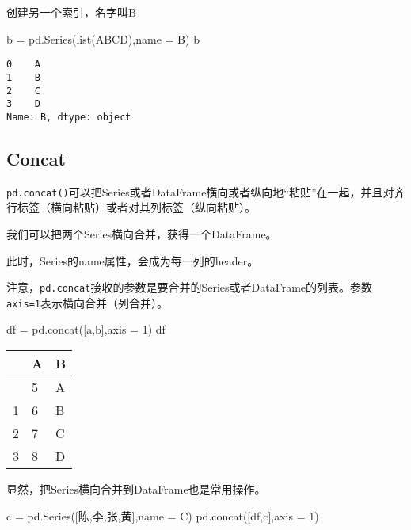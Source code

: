 \documentclass[
  letterpaper,
  DIV=11,
  numbers=noendperiod]{scrreprt}
\newenvironment{Shaded}{\begin{snugshade}}{\end{snugshade}}
\newcommand{\BuiltInTok}[1]{\textcolor[rgb]{0.00,0.23,0.31}{#1}}
\newcommand{\DecValTok}[1]{\textcolor[rgb]{0.68,0.00,0.00}{#1}}
\newcommand{\NormalTok}[1]{\textcolor[rgb]{0.00,0.23,0.31}{#1}}
\newcommand{\OperatorTok}[1]{\textcolor[rgb]{0.37,0.37,0.37}{#1}}
\newcommand{\StringTok}[1]{\textcolor[rgb]{0.13,0.47,0.30}{#1}}
\begin{document}
创建另一个索引，名字叫B

\begin{Shaded}
\begin{Highlighting}[]
\NormalTok{b }\OperatorTok{=}\NormalTok{ pd.Series(}\BuiltInTok{list}\NormalTok{(}\StringTok{\textquotesingle{}ABCD\textquotesingle{}}\NormalTok{),name }\OperatorTok{=} \StringTok{\textquotesingle{}B\textquotesingle{}}\NormalTok{)}
\NormalTok{b}
\end{Highlighting}
\end{Shaded}

\begin{verbatim}
0    A
1    B
2    C
3    D
Name: B, dtype: object
\end{verbatim}

\hypertarget{concat}{%
\subsection{Concat}\label{concat}}

\texttt{pd.concat()}可以把Series或者DataFrame横向或者纵向地``粘贴''在一起，并且对齐行标签（横向粘贴）或者对其列标签（纵向粘贴）。

我们可以把两个Series横向合并，获得一个DataFrame。

此时，Series的name属性，会成为每一列的header。

注意，\texttt{pd.concat}接收的参数是要合并的Series或者DataFrame的列表。参数\texttt{axis=1}表示横向合并（列合并）。

\begin{Shaded}
\begin{Highlighting}[]
\NormalTok{df }\OperatorTok{=}\NormalTok{ pd.concat([a,b],axis }\OperatorTok{=} \DecValTok{1}\NormalTok{)}
\NormalTok{df}
\end{Highlighting}
\end{Shaded}

\begin{longtable}[]{@{}lll@{}}
\toprule\noalign{}
& A & B \\
\midrule\noalign{}
\endhead
\bottomrule\noalign{}
\endlastfoot
0 & 5 & A \\
1 & 6 & B \\
2 & 7 & C \\
3 & 8 & D \\
\end{longtable}

显然，把Series横向合并到DataFrame也是常用操作。

\begin{Shaded}
\begin{Highlighting}[]
\NormalTok{c }\OperatorTok{=}\NormalTok{ pd.Series([}\StringTok{\textquotesingle{}陈\textquotesingle{}}\NormalTok{,}\StringTok{\textquotesingle{}李\textquotesingle{}}\NormalTok{,}\StringTok{\textquotesingle{}张\textquotesingle{}}\NormalTok{,}\StringTok{\textquotesingle{}黄\textquotesingle{}}\NormalTok{],name }\OperatorTok{=} \StringTok{\textquotesingle{}C\textquotesingle{}}\NormalTok{)}
\NormalTok{pd.concat([df,c],axis }\OperatorTok{=} \DecValTok{1}\NormalTok{)}
\end{Highlighting}
\end{Shaded}
\end{document}
